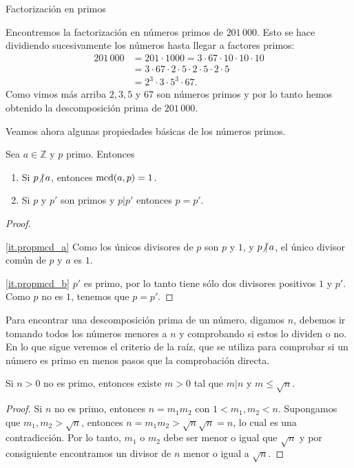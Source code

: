 \begin{section}{Factorización en primos}
\begin{ejemplo*} 
Encontremos la factorización en números primos de $201\,000$. Esto se hace di\-vi\-dien\-do  sucesivamente los números hasta llegar a factores primos:
\begin{align*}
201\,000 &= 201\cdot 1000 = 3\cdot 67\cdot 10\cdot 10\cdot 10\\ &=  3\cdot 67\cdot 2\cdot 5 \cdot 2\cdot 5 \cdot 2\cdot 5 \\&= 2^3\cdot 3\cdot 5^3\cdot 67.
\end{align*}
Como vimos más arriba $2, 3, 5$ y $67$ son  números primos y por lo tanto hemos obtenido la descomposición prima de $201\,000$.
\end{ejemplo*}


Veamos ahora algunas propiedades básicas de los números primos.

\begin{observacion} \label{pdivpp}
Sea $a \in \mathbb Z$ y $p$ primo. Entonces 
\begin{enumerate}[label=\textit{\alph*)}]
\item\label{it.propmcd_a}  Si $p{\operatorname{\not|\,} }a$, entonces $\operatorname{mcd}(a,p) = 1$.
\item\label{it.propmcd_b}  Si $p$ y $p'$ son primos y $p|p'$ entonces $p=p'$.
\end{enumerate}
\end{observacion}
\begin{proof}
\

\noindent \ref{it.propmcd_a} Como los únicos divisores de $p$ son $p$ y $1$, y $p{\operatorname{\not|\,} }a$, el único  divisor común de $p$ y $a$ es $1$.

\noindent \ref{it.propmcd_b} $p'$ es primo, por lo tanto tiene sólo dos divisores positivos $1$ y $p'$. Como $p$ no es $1$, tenemos que  $p=p'$.
\end{proof}

Para encontrar una descomposición prima de un número, digamos $n$, debemos ir tomando todos los números menores a $n$ y comprobando si estos lo dividen o no. En lo que sigue veremos el criterio de la raíz, que se utiliza para comprobar si un número es primo en menos pasos que la comprobación directa.  

\begin{lema} Si $n>0$ no es primo, entonces existe $m>0$ tal que $m|n$ y $m \le \sqrt{n}$.  
\end{lema}
\begin{proof}
Si $n$ no es primo, entonces $n = m_1m_2$ con $1 < m_1,m_2 < n$. Supongamos que $m_1,m_2 > \sqrt n$, entonces $n = m_1m_2 >  \sqrt n\sqrt n = n$, lo cual es una contradicción. Por lo tanto, $m_1$ o $m_2$ debe ser menor o igual que $\sqrt n$ y por consiguiente encontramos un divisor de $n$ menor o igual a  $\sqrt n$. 
\end{proof}


\end{section}

